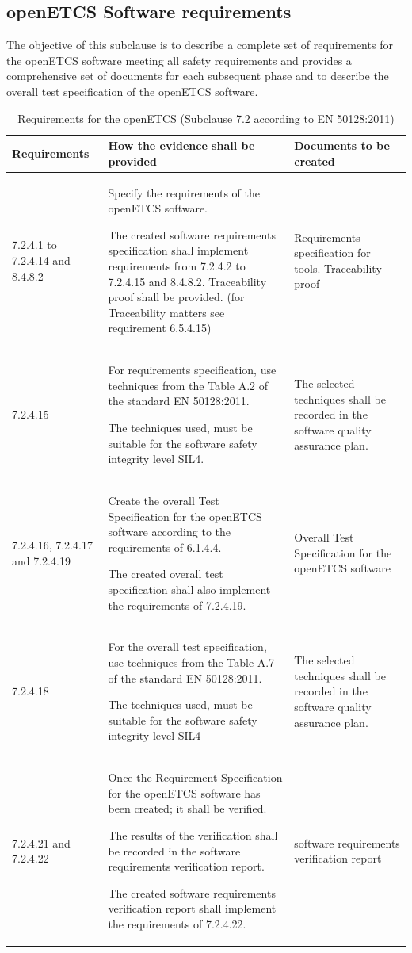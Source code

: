 \documentclass{template/openetcs_report}
\begin{document}
\subsection{openETCS Software requirements}
\begin{flushleft}
The objective of this subclause is to describe a complete set of requirements for the openETCS software meeting all safety requirements and provides a comprehensive set of documents for each subsequent phase and to describe the overall test specification of the openETCS software.
\end{flushleft}
{\footnotesize\sffamily\centering
\begin{longtable}{|p{2cm}|p{9cm}|p{3cm}|}
\caption{Requirements for the openETCS (Subclause 7.2 according to EN 50128:2011)}\\
\hline
\bfseries Requirements & \bfseries How the evidence shall be provided & \bfseries Documents to be created\\
\hline
\hline
\endhead
\hline
\endfoot

7.2.4.1 to 7.2.4.14 and 8.4.8.2 & Specify the requirements of the openETCS software.

The created software requirements specification shall implement requirements from 7.2.4.2 to 7.2.4.15 and 8.4.8.2.
\linebreak
\linebreak
Traceability proof shall be provided. (for Traceability matters see requirement 6.5.4.15)
& Requirements specification for tools.
Traceability proof\\ 
\hline
7.2.4.15 & For requirements specification, use techniques from the Table A.2 of the standard EN 50128:2011.

The techniques used, must be suitable for the software safety integrity level SIL4.
& The selected techniques shall be recorded in the software quality assurance plan.\\ 
\hline
7.2.4.16, 7.2.4.17 and 7.2.4.19 & Create the overall Test Specification for the openETCS software according to the requirements of 6.1.4.4.

The created overall test specification shall also implement the requirements of 7.2.4.19.
& Overall Test Specification for the openETCS software \\ 
\hline
7.2.4.18 & For the overall test specification, use techniques from the Table A.7 of the standard EN 50128:2011.

The techniques used, must be suitable for the software safety integrity level SIL4
& The selected techniques shall be recorded in the software quality assurance plan.\\ 
\hline
7.2.4.21 and 7.2.4.22 & Once the Requirement Specification for the openETCS software has been created; it shall be verified. 

The results of the verification shall be recorded in the software requirements verification report.

The created software requirements verification report shall implement the requirements of 7.2.4.22.
& software requirements verification report \\ 
\hline
\end{longtable}}
\end{document}
